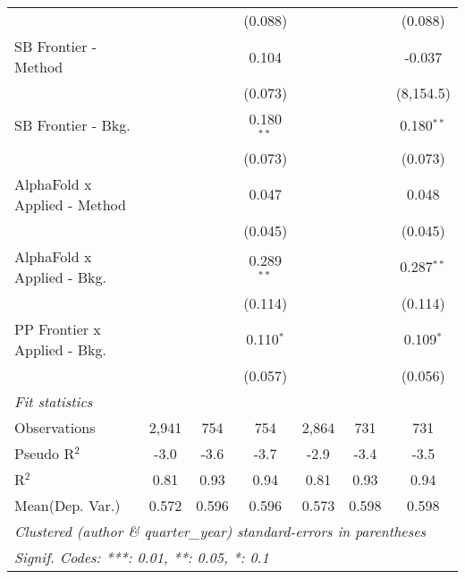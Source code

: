 \begin{tabular}{lcccccc}
                                &               &              & (0.088)      &               &              & (0.088)\\   
   SB Frontier - Method         &               &              & 0.104        &               &              & -0.037\\   
                                &               &              & (0.073)      &               &              & (8,154.5)\\   
   SB Frontier - Bkg.           &               &              & 0.180$^{**}$ &               &              & 0.180$^{**}$\\   
                                &               &              & (0.073)      &               &              & (0.073)\\   
   AlphaFold x Applied - Method &               &              & 0.047        &               &              & 0.048\\   
                                &               &              & (0.045)      &               &              & (0.045)\\   
   AlphaFold x Applied - Bkg.   &               &              & 0.289$^{**}$ &               &              & 0.287$^{**}$\\   
                                &               &              & (0.114)      &               &              & (0.114)\\   
   PP Frontier x Applied - Bkg. &               &              & 0.110$^{*}$  &               &              & 0.109$^{*}$\\   
                                &               &              & (0.057)      &               &              & (0.056)\\   
   \midrule
   \emph{Fit statistics}\\
   Observations                 & 2,941         & 754          & 754          & 2,864         & 731          & 731\\  
   Pseudo R$^2$                 & -3.0          & -3.6         & -3.7         & -2.9          & -3.4         & -3.5\\  
   R$^2$                        & 0.81          & 0.93         & 0.94         & 0.81          & 0.93         & 0.94\\  
Mean(Dep. Var.) & 0.572 & 0.596 & 0.596 & 0.573 & 0.598 & 0.598 \\
   \midrule \midrule
   \multicolumn{7}{l}{\emph{Clustered (author \& quarter\_year) standard-errors in parentheses}}\\
   \multicolumn{7}{l}{\emph{Signif. Codes: ***: 0.01, **: 0.05, *: 0.1}}\\
\end{tabular}
\par\endgroup
